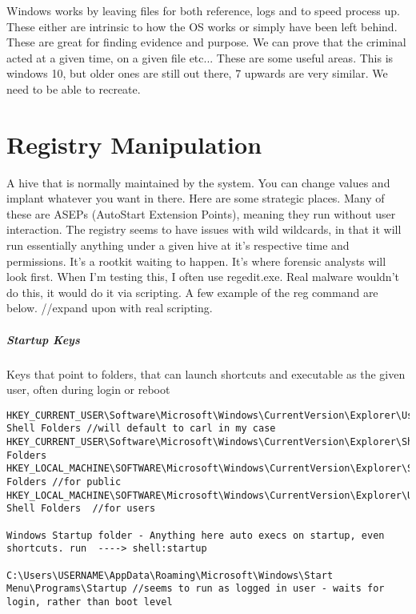 Windows works by leaving files for both reference, logs and to speed process up. These either are intrinsic to how the OS works or simply have been left behind. 
These are great for finding evidence and purpose. We can prove that the criminal acted at a given time, on a given file etc... These are some useful areas. This is windows 10, but older ones are still out there, 7 upwards are very similar. We need to be able to recreate.

\section{Registry Manipulation}
A hive that is normally maintained by the system. You can change values and implant whatever you want in there. Here are some strategic places. 
Many of these are ASEPs (AutoStart Extension Points), meaning they run without user interaction. The registry seems to have issues with wild wildcards, 
in that it will run essentially anything under a given hive at it's respective time and permissions. It's a rootkit waiting to happen. 
It's where forensic analysts will look first. When I'm testing this, I often use regedit.exe. Real malware wouldn't do this, it would do it via scripting. 
A few example of the reg command are below. 
//expand upon with real scripting.


\subparagraph{Startup Keys}
Keys that point to folders, that can launch shortcuts and executable as the given user, often during login or reboot
\begin{lstlisting}[label=RegistryStartupKeys,caption=Registry Startup Key Locations]
HKEY_CURRENT_USER\Software\Microsoft\Windows\CurrentVersion\Explorer\User Shell Folders //will default to carl in my case
HKEY_CURRENT_USER\Software\Microsoft\Windows\CurrentVersion\Explorer\Shell Folders
HKEY_LOCAL_MACHINE\SOFTWARE\Microsoft\Windows\CurrentVersion\Explorer\Shell Folders //for public
HKEY_LOCAL_MACHINE\SOFTWARE\Microsoft\Windows\CurrentVersion\Explorer\User Shell Folders  //for users

Windows Startup folder - Anything here auto execs on startup, even shortcuts. run  ----> shell:startup

C:\Users\USERNAME\AppData\Roaming\Microsoft\Windows\Start Menu\Programs\Startup //seems to run as logged in user - waits for login, rather than boot level

\end{lstlisting}

